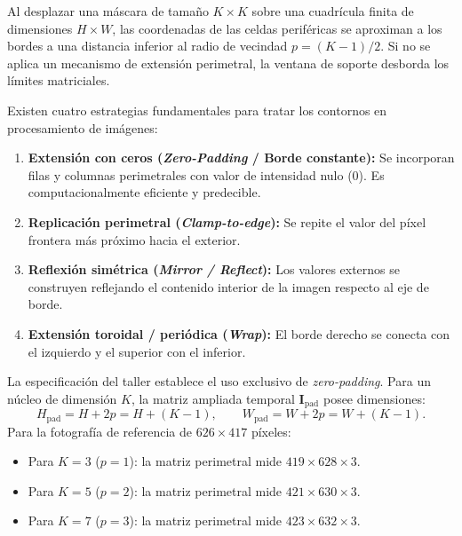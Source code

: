 \documentclass[11pt]{article}
\begin{document}
Al desplazar una máscara de tamaño $K \times K$ sobre una cuadrícula finita de dimensiones $H \times W$, las coordenadas de las celdas periféricas se aproximan a los bordes a una distancia inferior al radio de vecindad $p = (K-1)/2$. Si no se aplica un mecanismo de extensión perimetral, la ventana de soporte desborda los límites matriciales.

Existen cuatro estrategias fundamentales para tratar los contornos en procesamiento de imágenes:
\begin{enumerate}[itemsep=0.2em]
\item \textbf{Extensión con ceros (\textit{Zero-Padding} / Borde constante):} Se incorporan filas y columnas perimetrales con valor de intensidad nulo ($0$). Es computacionalmente eficiente y predecible.
\item \textbf{Replicación perimetral (\textit{Clamp-to-edge}):} Se repite el valor del píxel frontera más próximo hacia el exterior.
\item \textbf{Reflexión simétrica (\textit{Mirror / Reflect}):} Los valores externos se construyen reflejando el contenido interior de la imagen respecto al eje de borde.
\item \textbf{Extensión toroidal / periódica (\textit{Wrap}):} El borde derecho se conecta con el izquierdo y el superior con el inferior.
\end{enumerate}

La especificación del taller establece el uso exclusivo de \textit{zero-padding}. Para un núcleo de dimensión $K$, la matriz ampliada temporal $\mathbf{I}_{\text{pad}}$ posee dimensiones:
\begin{equation}
H_{\text{pad}} = H + 2p = H + (K-1), \qquad W_{\text{pad}} = W + 2p = W + (K-1).
\end{equation}
Para la fotografía de referencia de $626 \times 417$ píxeles:
\begin{itemize}[itemsep=0.2em]
\item Para $K=3$ ($p=1$): la matriz perimetral mide $419 \times 628 \times 3$.
\item Para $K=5$ ($p=2$): la matriz perimetral mide $421 \times 630 \times 3$.
\item Para $K=7$ ($p=3$): la matriz perimetral mide $423 \times 632 \times 3$.
\end{itemize}
\end{document}
